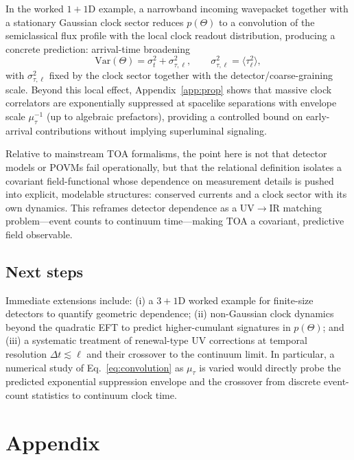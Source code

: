 \documentclass[pdflatex,sn-mathphys-num]{sn-jnl}
\theoremstyle{thmstylethree}
\theoremstyle{thmstyleone}
\theoremstyle{thmstyletwo}
\numberwithin{equation}{section}
\begin{document}
    In the worked $1+1$D example, a narrowband incoming wavepacket together with a stationary Gaussian clock sector reduces $p(\Theta)$ to a convolution of the semiclassical flux profile with the local clock readout distribution, producing a concrete prediction: arrival-time broadening
    \begin{equation}
        \mathrm{Var}(\Theta)=\sigma_t^2+\sigma_{\tau,\ell}^2,
        \qquad
        \sigma_{\tau,\ell}^2=\langle\tau_\ell^2\rangle,
    \end{equation}
    with $\sigma_{\tau,\ell}^2$ fixed by the clock sector together with the detector/coarse-graining scale. Beyond this local effect, Appendix~\ref{app:prop} shows that massive clock correlators are exponentially suppressed at spacelike separations with envelope scale $\mu_\tau^{-1}$ (up to algebraic prefactors), providing a controlled bound on early-arrival contributions without implying superluminal signaling.
    
    Relative to mainstream TOA formalisms, the point here is not that detector models or POVMs fail operationally, but that the relational definition isolates a covariant field-functional whose dependence on measurement details is pushed into explicit, modelable structures: conserved currents and a clock sector with its own dynamics. This reframes detector dependence as a UV$\rightarrow$IR matching problem---event counts to continuum time---making TOA a covariant, predictive field observable.
    
    \subsection*{Next steps}
        Immediate extensions include: (i) a $3+1$D worked example for finite-size detectors to quantify geometric dependence; (ii) non-Gaussian clock dynamics beyond the quadratic EFT to predict higher-cumulant signatures in $p(\Theta)$; and (iii) a systematic treatment of renewal-type UV corrections at temporal resolution $\Delta t\lesssim \ell$ and their crossover to the continuum limit. In particular, a numerical study of Eq.~\eqref{eq:convolution} as $\mu_\tau$ is varied would directly probe the predicted exponential suppression envelope and the crossover from discrete event-count statistics to continuum clock time.

        \appendix
    \section*{Appendix}
\end{document}
